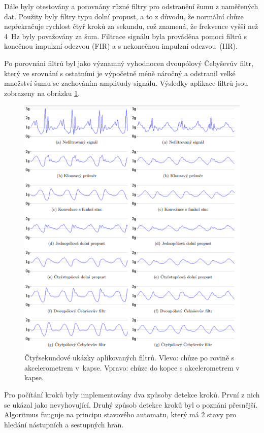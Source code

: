 Dále byly otestovány a porovnány různé filtry pro odstranění šumu z naměřených dat. Použity byly filtry typu dolní propust, a to z důvodu, že normální chůze nepřekračuje rychlost čtyř kroků za sekundu, což znamená, že frekvence vyšší než 4~Hz byly považovány za šum. Filtrace signálu byla prováděna pomoci filtrů s konečnou impulzní odezvou (FIR) a s nekonečnou impulzní odezvou~(IIR).

Po porovnáni filtrů byl jako významný vyhodnocen dvoupólový Čebyševův filtr, který ve srovnání s ostatními je výpočetně méně náročný a odstranil velké množství šumu se zachováním amplitudy signálu. Výsledky aplikace filtrů jsou zobrazeny na obrázku \ref{fig:filtr}.

\begin{figure}[!h]
	\centering
	\includegraphics[width = .865\linewidth]{Figures/Filtry.png}
	\captionsetup{justification = centering}
	\caption{Čtyřsekundové ukázky aplikovaných filtrů. Vlevo: chůze po rovině s akcelerometrem v~kapse. Vpravo: chůze do kopce s akcelerometrem v kapse.}
	\label{fig:filtr}
	\vspace{-15pt}
\end{figure}

Pro počítání kroků byly implementovány dva způsoby detekce kroků. První z nich se ukázal jako nevyhovující. Druhý způsob detekce kroků byl o poznáni přesnější. Algoritmus funguje na principu stavového automatu, který má 2 stavy pro hledání nástupních a sestupných hran.

